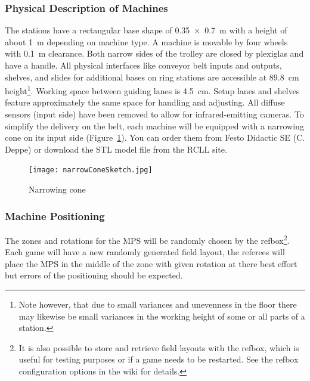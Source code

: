 \documentclass[12pt,twoside]{article}
\newcommand{\reffig}[1]{Figure~\ref{#1}}
\begin{document}
\subsubsection{Physical Description of Machines}

The stations have a rectangular base shape of \SI{0,35 x 0,7}{\metre}%
with a height of about \SI{1}{\metre} depending on machine type.
A machine is movable by four wheels with \SI{0.1}{\metre} clearance.
Both narrow sides of the trolley are closed by plexiglas and have a handle.
All physical interfaces like conveyor belt inputs and outputs, shelves, and
slides for additional bases on ring stations are accessible at
\SI{89.8}{\centi\metre} height\footnote{Note however, that due to small
  variances and unevenness in the floor there may likewise be small variances
  in the working height of some or all parts of a station.}.
Working space between guiding lanes is \SI{4.5}{\centi\metre}. Setup lanes and
shelves feature approximately the same space for handling and
adjusting. All diffuse sensors (input side) have been removed to allow
for infrared-emitting cameras.  To simplify the delivery on the belt,
each machine will be equipped with a narrowing cone on its input side
(\reffig{fig:narrow-cone}).  You can order them from Festo Didactic SE
(C. Deppe) or download the STL model file from the \ac{RCLL} site.
\begin{figure}
    \texttt{[image: narrowConeSketch.jpg]}
\caption{Narrowing cone}
\label{fig:narrow-cone}
\end{figure}
%

\subsubsection{Machine Positioning}
\label{sec:machine-swapping}
The zones and rotations for the \ac{MPS} will be randomly chosen by the
\ac{refbox}\footnote{It is also possible to store and retrieve field layouts
  with the \ac{refbox}, which is useful for testing purposes or if a game needs
  to be restarted. See the \ac{refbox} configuration options in the wiki
for details.}.
Each game will have a new randomly generated field layout, the referees will
place the \ac{MPS} in the middle of the zone with given rotation at there
best effort but errors of the positioning should be expected.
\end{document}
